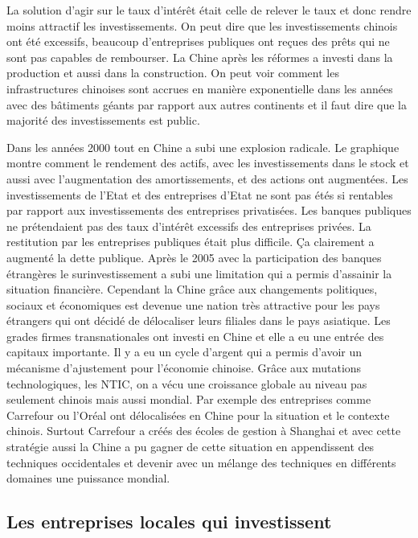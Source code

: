 La solution d’agir sur le taux d’intérêt était celle de relever le taux et donc rendre moins attractif les investissements. 
On peut dire que les investissements chinois ont été excessifs, beaucoup d’entreprises publiques ont reçues des prêts qui ne sont pas capables de rembourser. La Chine après les réformes a investi dans la production et aussi dans la construction.  On peut voir comment les infrastructures chinoises sont accrues en manière exponentielle dans les années avec des bâtiments géants par rapport aux autres continents et il faut dire que la majorité des investissements est public.

Dans les années 2000 tout en Chine a subi une explosion radicale. Le graphique montre comment le rendement des actifs, avec les investissements dans le stock et aussi avec l’augmentation des amortissements, et des actions ont augmentées.
Les investissements de l’Etat et des entreprises d’Etat ne sont pas étés si rentables par rapport aux investissements des entreprises privatisées. Les banques publiques ne prétendaient pas des taux d’intérêt excessifs des entreprises privées. La restitution par les entreprises publiques était plus difficile. Ça clairement a augmenté la dette publique. 
Après le 2005 avec la participation des banques étrangères le surinvestissement a subi une limitation qui a permis d’assainir la situation financière.
Cependant la Chine grâce aux changements politiques, sociaux et économiques est devenue une nation très attractive pour les pays étrangers qui ont décidé de délocaliser leurs filiales dans le pays asiatique. Les grades firmes transnationales ont investi en Chine et elle a eu une entrée des capitaux importante. Il y a eu un cycle d’argent qui a permis d’avoir un mécanisme d’ajustement pour l’économie chinoise. Grâce aux mutations technologiques, les NTIC, on a vécu une croissance globale au niveau pas seulement chinois mais aussi mondial.
Par exemple des entreprises comme Carrefour ou l’Oréal ont délocalisées en Chine pour la situation et le contexte chinois. Surtout Carrefour a créés des écoles de gestion à Shanghai et avec cette stratégie aussi la Chine a pu gagner de cette situation en appendissent des techniques occidentales et devenir avec un mélange des techniques en différents domaines une puissance mondial. 


\subsection{Les entreprises locales qui investissent}

